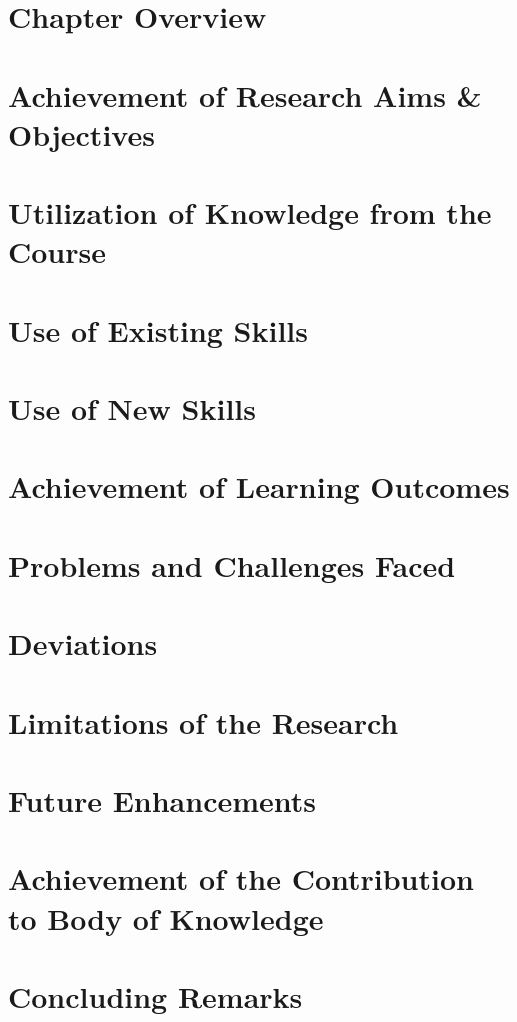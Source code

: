 \section{Chapter Overview}

\section{Achievement of Research Aims \& Objectives}


\section{Utilization of Knowledge from the Course}

\section{Use of Existing Skills}

\section{Use of New Skills}

\section{Achievement of Learning Outcomes}

\section{Problems and Challenges Faced}

\section{Deviations}

\section{Limitations of the Research}

\section{Future Enhancements}

\section{Achievement of the Contribution to Body of Knowledge}

\section{Concluding Remarks}